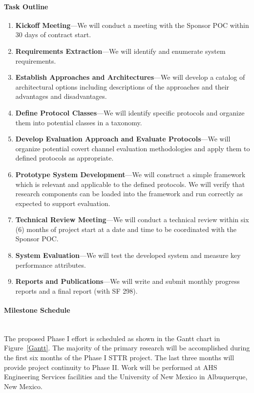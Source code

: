 \documentclass{sbir}
\begin{document}
\paragraph{Task Outline} 
\begin{enumerate}
\vspace{-0.1in}
\item {\bf Kickoff Meeting}---We will conduct a meeting with the Sponsor POC within 30 days of contract start.
\item {\bf Requirements Extraction}---We will identify and enumerate system requirements.
\item {\bf Establish Approaches and Architectures}---We will develop a catalog of architectural options including descriptions of the approaches and their advantages and disadvantages.
\item {\bf Define Protocol Classes}---We will identify specific protocols and organize them into potential classes in a taxonomy.
\item {\bf Develop Evaluation Approach and Evaluate Protocols}---We will organize potential covert channel evaluation methodologies and apply them to defined protocols as appropriate.
\item {\bf Prototype System Development}---We will construct a simple framework which is relevant and applicable to the defined protocols. We will verify that research components can be loaded into the framework and run correctly as expected to support evaluation.
\item {\bf Technical Review Meeting}---We will conduct a technical review within six (6) months of project start at a date and time to be coordinated with the Sponsor POC.
\item {\bf System Evaluation}---We will test the developed system and measure key performance attributes.
\item {\bf Reports and Publications}---We will write and submit monthly progress reports and a final report (with SF 298).
\end{enumerate}

\paragraph{Milestone Schedule}~\\
The proposed Phase I effort is scheduled as shown in the Gantt chart in Figure~\ref{Gantt}. The majority of the primary research will be accomplished during the first six months of the Phase I STTR project. The last three months will provide project continuity to Phase II. Work will be performed at AHS Engineering Services facilities and the University of New Mexico in Albuquerque, New Mexico.
\end{document}

